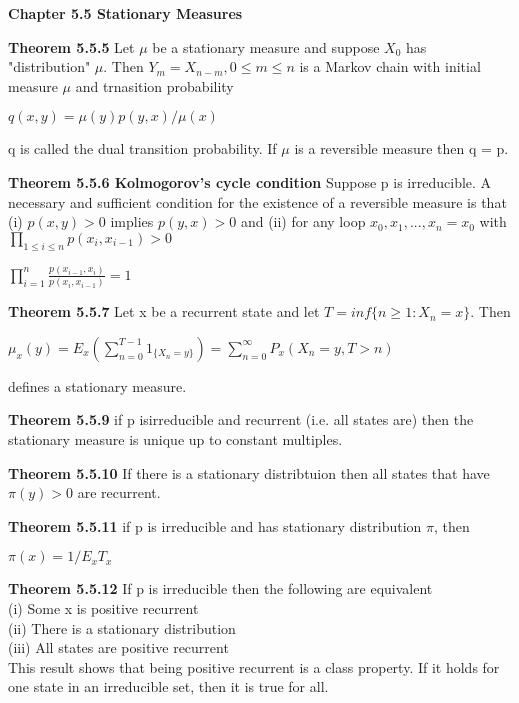 \documentclass{article}
\begin{document}
\textbf {Chapter 5.5 Stationary Measures}

\textbf {Theorem 5.5.5} Let $\mu$ be a stationary measure and suppose $X_0$ has "distribution" $\mu$. Then $Y_m = X_{n-m}, 0 \leq m \leq n$ is a Markov chain with initial measure $\mu$ and trnasition probability
\begin{center}
$q(x,y) = \mu(y)p(y,x)/\mu(x)$
\end{center}
q is called the dual transition probability. If $\mu$ is a reversible measure then q = p.

\textbf {Theorem 5.5.6 Kolmogorov's cycle condition} Suppose p is irreducible. A necessary and sufficient condition for the existence of a reversible measure is that (i) $p(x,y) > 0$ implies $p(y,x) > 0$ and (ii) for any loop $x_0, x_1 ,..., x_n = x_0$ with $\prod_{1 \leq i \leq n} p(x_i, x_{i -1}) > 0$
\begin{center}
$\prod_{i=1}^n \frac{p(x_{i-1}, x_i)}{p(x_i, x_{i-1})} = 1$
\end{center}

\textbf {Theorem 5.5.7} Let x be a recurrent state and let $T = inf\{n \geq 1 : X_n = x\}$. Then
\begin{center}
$\mu_x(y) = E_x (\sum_{n=0}^{T-1} 1_{\{X_n = y \}}) = \sum_{n=0}^\infty P_x (X_n = y, T > n)$
\end{center}
defines a stationary measure.

\textbf {Theorem 5.5.9} if p isirreducible and recurrent (i.e. all states are) then the stationary measure is unique up to constant multiples.

\textbf {Theorem 5.5.10} If there is a stationary distribtuion then all states that have $\pi(y) > 0$ are recurrent.

\textbf {Theorem 5.5.11} if p is irreducible and has stationary distribution $\pi$, then
\begin{center}
$\pi(x) = 1 / E_x T_x$
\end{center}

\textbf {Theorem 5.5.12} If p is irreducible then the following are equivalent  \\
(i) Some x is positive recurrent \\
(ii) There is a stationary distribution \\
(iii) All states are positive recurrent \\
This result shows that being positive recurrent is a class property. If it holds for one state in an irreducible set, then it is true for all.
\end{document}
